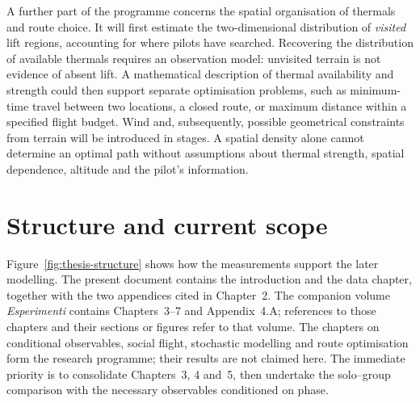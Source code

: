 A further part of the programme concerns the spatial organisation of thermals and route
choice. It will first estimate the two-dimensional distribution of \emph{visited} lift
regions, accounting for where pilots have searched. Recovering the distribution of
available thermals requires an observation model: unvisited terrain is not evidence of
absent lift. A mathematical description of thermal availability and strength could then
support separate optimisation problems, such as minimum-time travel between two locations,
a closed route, or maximum distance within a specified flight budget. Wind and, subsequently,
possible geometrical constraints from terrain will be introduced in stages. A spatial
density alone cannot determine an optimal path without assumptions about thermal strength,
spatial dependence, altitude and the pilot's information.

\section{Structure and current scope}

Figure~\ref{fig:thesis-structure} shows how the measurements support the later modelling.
The present document contains the introduction and the data chapter, together with
the two appendices cited in Chapter~2. The companion volume \emph{Esperimenti}
contains Chapters~3--7 and Appendix~4.A; references to those chapters and their
sections or figures refer to that volume. The chapters on conditional observables, social flight, stochastic
modelling and route optimisation form the research programme; their results are not
claimed here. The immediate priority is to consolidate Chapters~3,
4 and~5, then undertake the solo--group comparison with the
necessary observables conditioned on phase.

